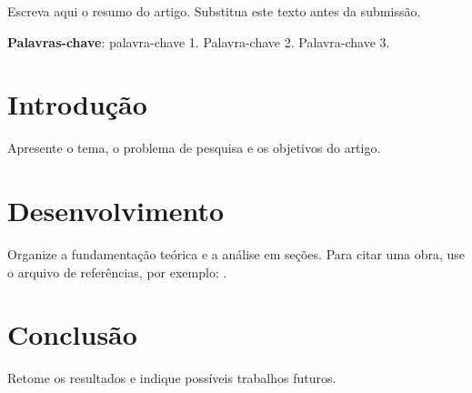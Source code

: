 \documentclass[12pt,oneside,a4paper]{abntex2}
\begin{document}
\imprimircapa
\imprimirfolhaderosto

\begin{resumo}
Escreva aqui o resumo do artigo. Substitua este texto antes da submissão.

\vspace{\onelineskip}
\noindent
\textbf{Palavras-chave}: palavra-chave 1. Palavra-chave 2. Palavra-chave 3.
\end{resumo}

\tableofcontents*
\clearpage

\textual
\chapter{Introdução}

Apresente o tema, o problema de pesquisa e os objetivos do artigo.

\chapter{Desenvolvimento}

Organize a fundamentação teórica e a análise em seções. Para citar uma obra,
use o arquivo de referências, por exemplo: \cite{exemplo2026}.

\chapter{Conclusão}

Retome os resultados e indique possíveis trabalhos futuros.

\postextual


\end{document}

